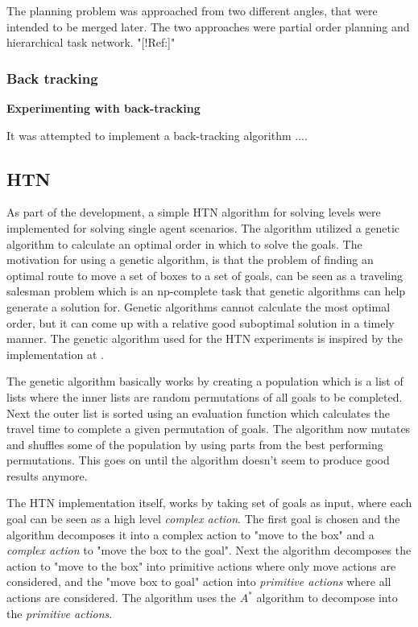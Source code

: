 \documentclass[Main]{subfiles}
\begin{document}
\FloatBarrier

The planning problem was approached from two different angles, that were intended to be merged later. The two approaches were partial order planning and hierarchical task network. "[!Ref:]" 


\subsubsection{Back tracking}

\textbf{Experimenting with back-tracking}

It was attempted to implement a back-tracking algorithm ....






\subsection{HTN}
As part of the development, a simple HTN algorithm for solving levels were implemented for solving single agent scenarios.
The algorithm utilized a genetic algorithm to calculate an optimal order in which to solve the goals.
The motivation for using a genetic algorithm, is that the problem of finding an optimal route to move a set of boxes to a set of goals, can be seen as a traveling salesman problem which is an np-complete task that genetic algorithms can help generate a solution for.
Genetic algorithms cannot calculate the most optimal order, but it can come up with a relative good suboptimal solution in a timely manner. The genetic algorithm used for the HTN experiments is inspired by the implementation at \cite{genetic}.

The genetic algorithm basically works by creating a population which is a list of lists where the inner lists are random permutations of all goals to be completed.
Next the outer list is sorted using an evaluation function which calculates the travel time to complete a given permutation of goals.
The algorithm now mutates and shuffles some of the population by using parts from the best performing permutations.
This goes on until the algorithm doesn't seem to produce good results anymore.

The HTN implementation itself, works by taking set of goals as input, where each goal can be seen as a high level \textit{complex action}. The first goal is chosen and the algorithm decomposes it into a complex action to "move to the box" and a \textit{complex action} to "move the box to the goal". Next the algorithm decomposes the action to "move to the box" into primitive actions where only move actions are considered, and the "move box to goal" action into \textit{primitive actions} where all actions are considered.
The algorithm uses the $A^*$ algorithm to decompose into the \textit{primitive actions}.
\end{document}
